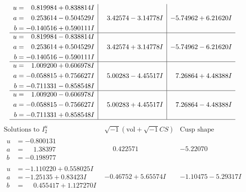 \documentclass[1p]{elsarticle_modified}
\theoremstyle{definition}
\newcommand{\I}{\sqrt{-1}}
\begin{document}
$$\begin{array}{c|c|c}
\begin{aligned}
u &= \phantom{-}0.819984 + 0.838814 I \\
a &= \phantom{-}0.253614 - 0.504529 I \\
b &= -0.140516 + 0.590111 I\end{aligned}
 & \phantom{-}3.42574 - 3.14778 I & -5.74962 + 6.21620 I \\ \hline\begin{aligned}
u &= \phantom{-}0.819984 - 0.838814 I \\
a &= \phantom{-}0.253614 + 0.504529 I \\
b &= -0.140516 - 0.590111 I\end{aligned}
 & \phantom{-}3.42574 + 3.14778 I & -5.74962 - 6.21620 I \\ \hline\begin{aligned}
u &= \phantom{-}1.009200 + 0.606978 I \\
a &= -0.058815 + 0.756627 I \\
b &= -0.711331 - 0.858548 I\end{aligned}
 & \phantom{-}5.00283 - 4.45517 I & \phantom{-}7.26864 + 4.48388 I \\ \hline\begin{aligned}
u &= \phantom{-}1.009200 - 0.606978 I \\
a &= -0.058815 - 0.756627 I \\
b &= -0.711331 + 0.858548 I\end{aligned}
 & \phantom{-}5.00283 + 4.45517 I & \phantom{-}7.26864 - 4.48388 I\\
 \hline 
 \end{array}$$\newpage$$\begin{array}{c|c|c}  
\text{Solutions to }I^u_{2}& \I (\text{vol} + \sqrt{-1}CS) & \text{Cusp shape}\\
 \hline 
\begin{aligned}
u &= -0.800131\phantom{ +0.000000I} \\
a &= \phantom{-}1.38397\phantom{ +0.000000I} \\
b &= -0.198977\phantom{ +0.000000I}\end{aligned}
 & \phantom{-}0.422571\phantom{ +0.000000I} & -5.22070\phantom{ +0.000000I} \\ \hline\begin{aligned}
u &= -1.110220 + 0.558025 I \\
a &= -1.25135 + 0.83423 I \\
b &= \phantom{-}0.455417 + 1.127270 I\end{aligned}
 & -0.46752 + 5.65574 I & -1.10475 - 5.29317 I \\ \hline\begin{aligned}

\end{aligned}
\end{array}$$
\end{document}
